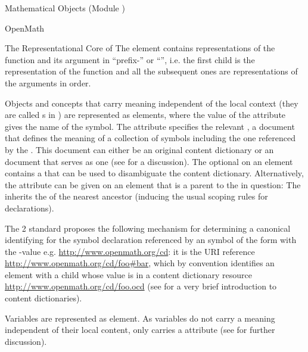 \begin{tchapter}[id=mobj,short=Mathematical Objects]{Mathematical Objects (Module {})}
\begin{tsection}[id=openmath]{OpenMath}
\begin{tsubsection}[id=om:core]{The Representational Core of {\openmath}}
The {} element contains representations of the function and its
argument in ``prefix-'' or ``{}'',
i.e. the first child is the representation of the function and all the subsequent ones are
representations of the arguments in order.

Objects and concepts that carry meaning independent of the local context (they are called
{s} in {\openmath}) are represented as {} elements,
where the value of the {} attribute gives the name of the
symbol.  The {} attribute specifies the relevant
{}, a document that defines the meaning of a collection of
symbols including the one referenced by the {}.  This document can
either be an original {\openmath} content dictionary or an {\omdoc} document that serves
as one (see {} for a discussion).  The optional
{} on an {} element contains a
{} that can be used to disambiguate the content dictionary.  Alternatively,
the {} attribute can be given on an {\openmath} element that is a
parent to the {} in question: The {}
inherits the {} of the nearest ancestor (inducing the usual {\xml}
scoping rules for declarations).

The {\openmath}2 standard proposes the following mechanism for determining a canonical
identifying {} for the symbol declaration referenced by an {\openmath}
symbol of the form {} with the
{}-value e.g.  \url{http://www.openmath.org/cd}: it is the URI
reference \url{http://www.openmath.org/cd/foo#bar}, which by convention identifies an
{} element with a child {}
whose value is {} in a content dictionary resource
\url{http://www.openmath.org/cd/foo.ocd} (see {} for a
very brief introduction to {\openmath} content dictionaries). 

Variables are represented as {} element.  As variables do not
carry a meaning independent of their local content, {} only
carries a {} attribute (see {} for
further discussion).


\end{tsubsection}
\end{tsection}
\end{tchapter}
